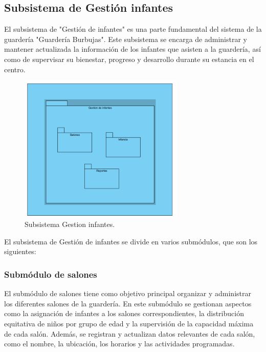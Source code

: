 \subsection{Subsistema de Gestión infantes}

El subsistema de "Gestión de infantes" es una parte fundamental del sistema de la guardería "Guardería Burbujas". Este subsistema se encarga de administrar y mantener actualizada la información de los infantes que asisten a la guardería, así como de supervisar su bienestar, progreso y desarrollo durante su estancia en el centro.


\begin{figure}[htbp]
\centering
\includegraphics[width=0.7\textwidth]{images/arqui/subSisGestInfant.png}
\caption{Subsistema Gestion infantes.}
\label{fig:subsistGestionInfan}
\end{figure}

El subsistema de Gestión de infantes se divide en varios submódulos, que son los siguientes:

\subsubsection{Submódulo de salones}
El submódulo de salones tiene como objetivo principal organizar y administrar los diferentes salones de la guardería. En este submódulo se gestionan aspectos como la asignación de infantes a los salones correspondientes, la distribución equitativa de niños por grupo de edad y la supervisión de la capacidad máxima de cada salón. Además, se registran y actualizan datos relevantes de cada salón, como el nombre, la ubicación, los horarios y las actividades programadas.


